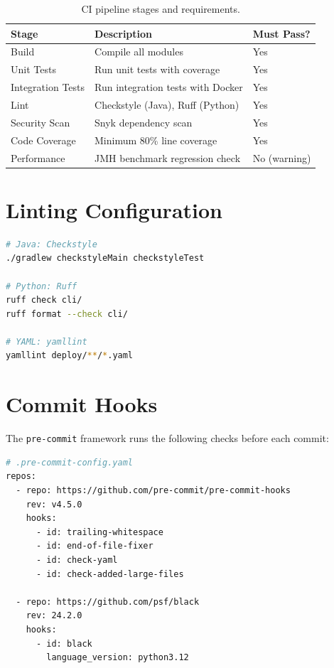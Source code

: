 \documentclass[
    language=english,
    doctype=standard,
    institution=none,
    titlestyle=book,
    oneside,
]{../../omnilatex}
\begin{document}
\begin{table}[htbp]
    \centering
    \caption{CI pipeline stages and requirements.}
    \label{tab:ci-stages}
    \begin{tabular}{@{}lp{6cm}p{3cm}@{}}
        \toprule
        Stage & Description & Must Pass? \\
        \midrule
        Build & Compile all modules & Yes \\
        Unit Tests & Run unit tests with coverage & Yes \\
        Integration Tests & Run integration tests with Docker & Yes \\
        Lint & Checkstyle (Java), Ruff (Python) & Yes \\
        Security Scan & Snyk dependency scan & Yes \\
        Code Coverage & Minimum 80\% line coverage & Yes \\
        Performance & JMH benchmark regression check & No (warning) \\
        \bottomrule
    \end{tabular}
\end{table}

\section{Linting Configuration}

\begin{lstlisting}[language=bash, caption={Run linting locally.}]
# Java: Checkstyle
./gradlew checkstyleMain checkstyleTest

# Python: Ruff
ruff check cli/
ruff format --check cli/

# YAML: yamllint
yamllint deploy/**/*.yaml
\end{lstlisting}

\section{Commit Hooks}

The \texttt{pre-commit} framework runs the following checks before each
commit:

\begin{lstlisting}[language=bash, caption={pre-commit configuration.}]
# .pre-commit-config.yaml
repos:
  - repo: https://github.com/pre-commit/pre-commit-hooks
    rev: v4.5.0
    hooks:
      - id: trailing-whitespace
      - id: end-of-file-fixer
      - id: check-yaml
      - id: check-added-large-files

  - repo: https://github.com/psf/black
    rev: 24.2.0
    hooks:
      - id: black
        language_version: python3.12
\end{lstlisting}
\end{document}
